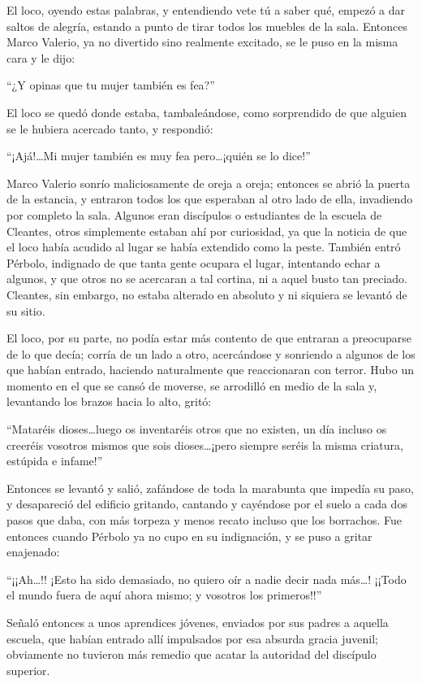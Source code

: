 \documentclass[11pt,openany]{book}
\begin{document}
El loco, oyendo estas palabras, y entendiendo vete tú a saber qué, empezó a dar saltos de alegría, estando a punto de tirar todos los muebles de la sala. Entonces Marco Valerio, ya no divertido sino realmente excitado, se le puso en la misma cara y le dijo: 

“¿Y opinas que tu mujer también es fea?” 

El loco se quedó donde estaba, tambaleándose, como sorprendido de que alguien se le hubiera acercado tanto, y respondió: 

“¡Ajá!\dots Mi mujer también es muy fea pero\dots ¡quién se lo dice!” 

Marco Valerio sonrío maliciosamente de oreja a oreja; entonces se abrió la puerta de la estancia, y entraron todos los que esperaban al otro lado de ella, invadiendo por completo la sala. Algunos eran discípulos o estudiantes de la escuela de Cleantes, otros simplemente estaban ahí por curiosidad, ya que la noticia de que el loco había acudido al lugar se había extendido como la peste. También entró Pérbolo, indignado de que tanta gente ocupara el lugar, intentando echar a algunos, y que otros no se acercaran a tal cortina, ni a aquel busto tan preciado. Cleantes, sin embargo, no estaba alterado en absoluto y ni siquiera se levantó de su sitio. 

El loco, por su parte, no podía estar más contento de que entraran a preocuparse de lo que decía; corría de un lado a otro, acercándose y sonriendo a algunos de los que habían entrado, haciendo naturalmente que reaccionaran con terror. Hubo un momento en el que se cansó de moverse, se arrodilló en medio de la sala y, levantando los brazos hacia lo alto, gritó: 

“Mataréis dioses\dots luego os inventaréis otros que no existen, un día incluso os creeréis vosotros mismos que sois dioses\dots ¡pero siempre seréis la misma criatura, estúpida e infame!” 

Entonces se levantó y salió, zafándose de toda la marabunta que impedía su paso, y desapareció del edificio gritando, cantando y cayéndose por el suelo a cada dos pasos que daba, con más torpeza y menos recato incluso que los borrachos. Fue entonces cuando Pérbolo ya no cupo en su indignación, y se puso a gritar enajenado: 

“¡¡Ah\dots!! ¡Esto ha sido demasiado, no quiero oír a nadie decir nada más\dots! ¡¡Todo el mundo fuera de aquí ahora mismo; y vosotros los primeros!!” 

Señaló entonces a unos aprendices jóvenes, enviados por sus padres a aquella escuela, que habían entrado allí impulsados por esa absurda gracia juvenil; obviamente no tuvieron más remedio que acatar la autoridad del discípulo superior. 
\end{document}

